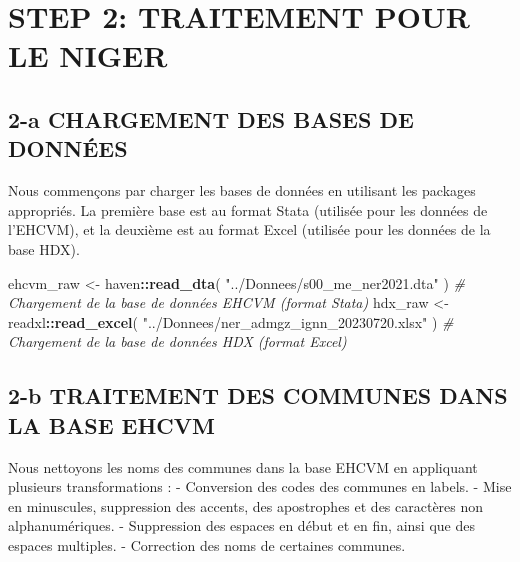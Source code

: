 \documentclass[
]{article}
\newenvironment{Shaded}{\begin{snugshade}}{\end{snugshade}}
\newcommand{\CommentTok}[1]{\textcolor[rgb]{0.56,0.35,0.01}{\textit{#1}}}
\newcommand{\FunctionTok}[1]{\textcolor[rgb]{0.13,0.29,0.53}{\textbf{#1}}}
\newcommand{\NormalTok}[1]{#1}
\newcommand{\OtherTok}[1]{\textcolor[rgb]{0.56,0.35,0.01}{#1}}
\newcommand{\SpecialCharTok}[1]{\textcolor[rgb]{0.81,0.36,0.00}{\textbf{#1}}}
\newcommand{\StringTok}[1]{\textcolor[rgb]{0.31,0.60,0.02}{#1}}
\begin{document}
\newpage
{}
\section*{\centering \Huge  STEP 2: TRAITEMENT POUR LE NIGER}

\subsection{2-a CHARGEMENT DES BASES DE
DONNÉES}\label{a-chargement-des-bases-de-donnuxe9es}

Nous commençons par charger les bases de données en utilisant les
packages appropriés. La première base est au format Stata (utilisée pour
les données de l'EHCVM), et la deuxième est au format Excel (utilisée
pour les données de la base HDX).

\begin{Shaded}
\begin{Highlighting}[]
\NormalTok{ehcvm\_raw }\OtherTok{\textless{}{-}}\NormalTok{ haven}\SpecialCharTok{::}\FunctionTok{read\_dta}\NormalTok{(}
  \StringTok{"../Donnees/s00\_me\_ner2021.dta"}
\NormalTok{  )  }\CommentTok{\# Chargement de la base de données EHCVM (format Stata)}
\NormalTok{hdx\_raw }\OtherTok{\textless{}{-}}\NormalTok{ readxl}\SpecialCharTok{::}\FunctionTok{read\_excel}\NormalTok{(}
  \StringTok{"../Donnees/ner\_admgz\_ignn\_20230720.xlsx"}
\NormalTok{  ) }\CommentTok{\# Chargement de la base de données HDX (format Excel)}
\end{Highlighting}
\end{Shaded}

\subsection{2-b TRAITEMENT DES COMMUNES DANS LA BASE
EHCVM}\label{b-traitement-des-communes-dans-la-base-ehcvm}

Nous nettoyons les noms des communes dans la base EHCVM en appliquant
plusieurs transformations : - Conversion des codes des communes en
labels. - Mise en minuscules, suppression des accents, des apostrophes
et des caractères non alphanumériques. - Suppression des espaces en
début et en fin, ainsi que des espaces multiples. - Correction des noms
de certaines communes.
\end{document}
